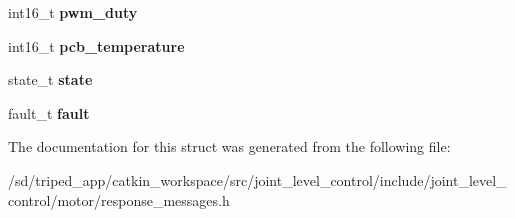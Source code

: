 \begin{DoxyCompactItemize}
\item 
\mbox{\label{structControlResponse_abeb5c1b5e5fed33dcfb6595b06ad8d1b}} 
int16\+\_\+t {\bfseries pwm\+\_\+duty}
\item 
\mbox{\label{structControlResponse_ad11ecc5814970e9b7a3f0d9471d07ae1}} 
int16\+\_\+t {\bfseries pcb\+\_\+temperature}
\item 
\mbox{\label{structControlResponse_af726a4b6a342d214b606a048ed070989}} 
state\+\_\+t {\bfseries state}
\item 
\mbox{\label{structControlResponse_a73672473e86060a346b0d55d3c1ac62d}} 
fault\+\_\+t {\bfseries fault}
\end{DoxyCompactItemize}


The documentation for this struct was generated from the following file\+:\begin{DoxyCompactItemize}
\item 
/sd/triped\+\_\+app/catkin\+\_\+workspace/src/joint\+\_\+level\+\_\+control/include/joint\+\_\+level\+\_\+control/motor/response\+\_\+messages.\+h\end{DoxyCompactItemize}
